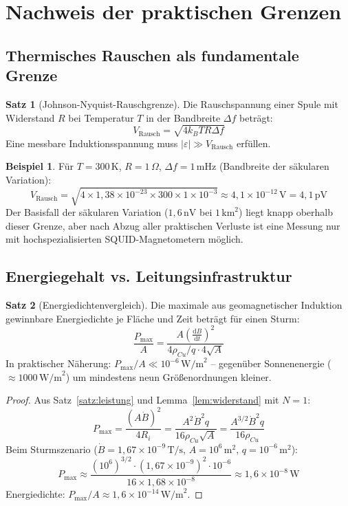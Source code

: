 ﻿\documentclass[a4paper,12pt]{article}
\theoremstyle{definition}
\newtheorem{beispiel}{Beispiel}
\newtheorem{satz}{Satz}
\begin{document}
\section{Nachweis der praktischen Grenzen}

\subsection{Thermisches Rauschen als fundamentale Grenze}

\begin{satz}[Johnson-Nyquist-Rauschgrenze]
\label{satz:rauschen}
    Die Rauschspannung einer Spule mit Widerstand $R$ bei Temperatur $T$
    in der Bandbreite $\Delta f$ betr\"agt:
    \[
        V_{\text{Rausch}} = \sqrt{4 k_B T R \Delta f}
    \]
    Eine messbare Induktionsspannung muss $|\varepsilon| \gg V_{\text{Rausch}}$
    erf\"ullen.
\end{satz}

\begin{beispiel}
    F\"ur $T = 300\,\mathrm{K}$, $R = 1\,\Omega$, $\Delta f = 1\,\mathrm{mHz}$
    (Bandbreite der s\"akularen Variation):
    \[
        V_{\text{Rausch}} = \sqrt{4 \times 1{,}38 \times 10^{-23} \times 300 \times 1 \times 10^{-3}}
        \approx 4{,}1 \times 10^{-12}\,\mathrm{V} = 4{,}1\,\mathrm{pV}
    \]
    Der Basisfall der s\"akularen Variation ($1{,}6\,\mathrm{nV}$ bei $1\,\mathrm{km}^2$)
    liegt knapp oberhalb dieser Grenze, aber nach Abzug aller praktischen Verluste
    ist eine Messung nur mit hochspezialisierten SQUID-Magnetometern m\"oglich.
\end{beispiel}

\subsection{Energiegehalt vs. Leitungsinfrastruktur}

\begin{satz}[Energiedichtenvergleich]
    Die maximale aus geomagnetischer Induktion gewinnbare Energiedichte
    je Fl\"ache und Zeit betr\"agt f\"ur einen Sturm:
    \[
        \frac{P_{\max}}{A} = \frac{A\left(\tfrac{\mathrm{d}B}{\mathrm{d}t}\right)^2}{4\rho_{Cu}/q \cdot 4\sqrt{A}}
    \]
    In praktischer N\"aherung: $P_{\max}/A \ll 10^{-6}\,\mathrm{W/m}^2$
    -- gegen\"uber Sonnenenergie ($\approx 1000\,\mathrm{W/m}^2$)
    um mindestens neun Gr\"o{\ss}enordnungen kleiner.
\end{satz}

\begin{proof}
    Aus Satz~\ref{satz:leistung} und Lemma~\ref{lem:widerstand} mit $N=1$:
    \[
        P_{\max} = \frac{(A\dot{B})^2}{4 R_i}
        = \frac{A^2 \dot{B}^2 q}{16 \rho_{Cu}\sqrt{A}}
        = \frac{A^{3/2} \dot{B}^2 q}{16\rho_{Cu}}
    \]
    Beim Sturmszenario ($\dot{B} = 1{,}67 \times 10^{-9}\,\mathrm{T/s}$,
    $A = 10^6\,\mathrm{m}^2$, $q = 10^{-6}\,\mathrm{m}^2$):
    \[
        P_{\max} \approx \frac{(10^6)^{3/2} \cdot (1{,}67\times10^{-9})^2 \cdot 10^{-6}}
        {16 \times 1{,}68\times10^{-8}}
        \approx 1{,}6 \times 10^{-8}\,\mathrm{W}
    \]
    Energiedichte: $P_{\max}/A \approx 1{,}6 \times 10^{-14}\,\mathrm{W/m}^2$.
\end{proof}
\end{document}
